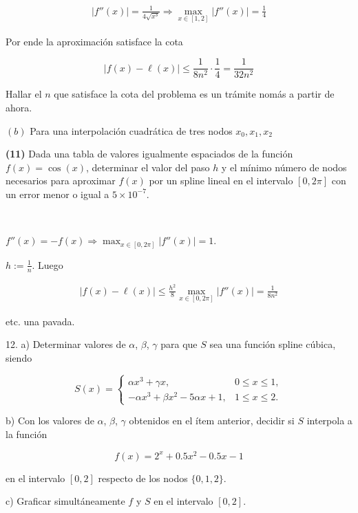 \documentclass[12pt]{article}
\begin{document}
\begin{align*}
    \left| f''(x) \right| = \frac{1}{4\sqrt{x^3} } \Rightarrow \max_{x \in [1,
    2]} \left| f''(x) \right| = \frac{1}{4}
\end{align*}

Por ende la aproximación satisface la cota 

\begin{equation*}
    \left| f(x) - \ell(x) \right| \leq \frac{1}{8n^2} \cdot \frac{1}{4} =
    \frac{1}{32n^2}
\end{equation*}

Hallar el $n$ que satisface la cota del problema es un trámite nomás a partir de
ahora.

$(b)$ Para una interpolación cuadrática de tres nodos $x_0, x_1, x_2$

\pagebreak 

\begin{myframe}
    \textbf{(11)} Dada una tabla de valores igualmente espaciados de la función
    $f(x)=\cos(x)$, determinar el valor del paso $h$ y el mínimo número de nodos
    necesarios para aproximar $f(x)$ por un spline lineal en el intervalo
    $[0,2\pi]$ con un error menor o igual a $5\times10^{-7}$.
\end{myframe}

~ 

$f''(x) = - f(x) \Rightarrow \max_{x \in [0, 2 \pi]} \left| f''(x) \right| = 1$.

$h := \frac{1}{n}$. Luego

\begin{align*}
    \left| f(x) - \ell(x) \right|\leq \frac{h^2}{8} \max_{x \in [0, 2 \pi]}
    \left| f''(x) \right| = \frac{1}{8n^2}
\end{align*}

etc. una pavada.
\pagebreak 

\begin{myframe}
    12. a) Determinar valores de $\alpha$, $\beta$, $\gamma$ para que $S$ sea una
función spline cúbica, siendo

\[
S(x)=
\begin{cases}
\alpha x^3+\gamma x, & 0\le x\le1,\\
-\alpha x^3+\beta x^2-5\alpha x+1, & 1\le x\le2.
\end{cases}
\]

b) Con los valores de $\alpha$, $\beta$, $\gamma$ obtenidos en el ítem anterior,
decidir si $S$ interpola a la función

\[
f(x)=2^x+0.5x^2-0.5x-1
\]

en el intervalo $[0,2]$ respecto de los nodos $\{0,1,2\}$.

c) Graficar simultáneamente $f$ y $S$ en el intervalo $[0,2]$.
\end{myframe}
\end{document}

